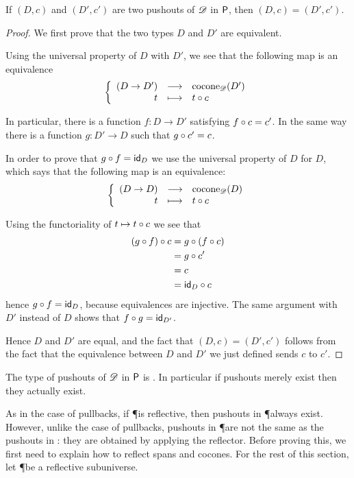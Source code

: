 \begin{lem}
  If $(D,c)$ and $(D',c')$ are two pushouts of $\Ddiag$ in $\P$, then
  $(D,c)=(D',c')$.
\end{lem}
\begin{proof}
  We first prove that the two types $D$ and $D'$ are equivalent.

  Using the universal property of $D$ with $D'$, we see that the following map is an
  equivalence
  \[\function{(D\to{}D')}{\cocone{\Ddiag}{D'}}{t}{\composecocone{t}c}\]

  In particular, there is a function $f:D\to{}D'$ satisfying $\composecocone{f}c=c'$. In the
  same way there is a function $g:D'\to{}D$ such that $\composecocone{g}c'=c$.

  In order to prove that $g\circ{}f=\idfunc[D]$ we use the universal property of
  $D$ for $D$, which says that the following map is an equivalence:
  \[\function{(D\to{}D)}{\cocone{\Ddiag}{D}}{t}{\composecocone{t}c}\]

  Using the functoriality of $t\mapsto{}\composecocone{t}c$ we see that
  \begin{align*}
    \composecocone{(g\circ{}f)}c &= \composecocone{g}(\composecocone{f}c) \\
    &= \composecocone{g}c' \\
    &= c \\
    &= \composecocone{\idfunc[D]}c
  \end{align*}
  hence
  $g\circ{}f=\idfunc[D]$, because equivalences are injective. The same argument
  with $D'$ instead of $D$ shows that $f\circ{}g=\idfunc[D']$.

  Hence $D$ and $D'$ are equal, and the fact that $(D,c)=(D',c')$ follows from
  the fact that the equivalence between $D$ and $D'$ we just defined sends $c$
  to $c'$.
\end{proof}

\begin{cor}
  The type of pushouts of $\Ddiag$ in $\P$ is \anhprop. In particular if
  pushouts merely exist then they actually exist.
\end{cor}

As in the case of pullbacks, if \P is reflective, then pushouts in \P always exist.
However, unlike the case of pullbacks, pushouts in \P are not the same as the pushouts in \type: they are obtained by applying the
reflector.
Before proving this, we first need to explain how to reflect spans and cocones.
For the rest of this section, let \P be a reflective subuniverse.

